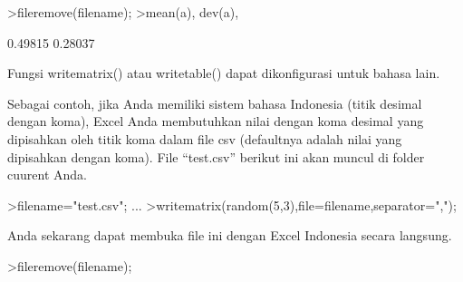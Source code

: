 \documentclass[a4paper,10pt]{article}
\begin{document}
\begin{eulernotebook}
\begin{eulercomment}
\begin{eulercomment}
\begin{eulercomment}
\begin{eulercomment}
\begin{eulercomment}
\begin{eulercomment}
\begin{eulercomment}
\begin{eulercomment}
\begin{eulercomment}
\begin{eulercomment}
\begin{eulercomment}
\begin{eulercomment}
\begin{eulercomment}
\begin{eulercomment}
\begin{eulercomment}
\begin{eulercomment}
\begin{eulercomment}
\begin{eulercomment}
\begin{eulercomment}
\begin{eulercomment}
\begin{eulercomment}
\begin{eulercomment}
\begin{eulercomment}
\begin{eulercomment}
\begin{eulercomment}
\begin{eulercomment}
\begin{eulercomment}
\begin{eulercomment}
\begin{eulercomment}
\begin{eulercomment}
\begin{eulercomment}
\begin{eulercomment}
\begin{eulercomment}
\begin{eulercomment}
\begin{eulercomment}
\begin{eulercomment}
\begin{eulercomment}
\begin{eulercomment}
\begin{eulercomment}
\begin{eulercomment}
\begin{eulercomment}
\begin{eulercomment}
\begin{eulercomment}
\begin{eulercomment}
\begin{eulercomment}
\begin{eulercomment}
\begin{eulercomment}
\begin{eulercomment}
\begin{eulercomment}
\begin{eulercomment}
\begin{eulerprompt}
>fileremove(filename);
>mean(a), dev(a),
\end{eulerprompt}
\begin{euleroutput}
  0.49815
  0.28037
\end{euleroutput}
\begin{eulercomment}
Fungsi writematrix() atau writetable() dapat dikonfigurasi untuk
bahasa lain.

Sebagai contoh, jika Anda memiliki sistem bahasa Indonesia (titik
desimal dengan koma), Excel Anda membutuhkan nilai dengan koma desimal
yang dipisahkan oleh titik koma dalam file csv (defaultnya adalah
nilai yang dipisahkan dengan koma). File “test.csv” berikut ini akan
muncul di folder cuurent Anda.
\end{eulercomment}
\begin{eulerprompt}
>filename="test.csv"; ...
>writematrix(random(5,3),file=filename,separator=",");
\end{eulerprompt}
\begin{eulercomment}
Anda sekarang dapat membuka file ini dengan Excel Indonesia secara
langsung.
\end{eulercomment}
\begin{eulerprompt}
>fileremove(filename);

\end{eulerprompt}
\end{eulercomment}
\end{eulercomment}
\end{eulercomment}
\end{eulercomment}
\end{eulercomment}
\end{eulercomment}
\end{eulercomment}
\end{eulercomment}
\end{eulercomment}
\end{eulercomment}
\end{eulercomment}
\end{eulercomment}
\end{eulercomment}
\end{eulercomment}
\end{eulercomment}
\end{eulercomment}
\end{eulercomment}
\end{eulercomment}
\end{eulercomment}
\end{eulercomment}
\end{eulercomment}
\end{eulercomment}
\end{eulercomment}
\end{eulercomment}
\end{eulercomment}
\end{eulercomment}
\end{eulercomment}
\end{eulercomment}
\end{eulercomment}
\end{eulercomment}
\end{eulercomment}
\end{eulercomment}
\end{eulercomment}
\end{eulercomment}
\end{eulercomment}
\end{eulercomment}
\end{eulercomment}
\end{eulercomment}
\end{eulercomment}
\end{eulercomment}
\end{eulercomment}
\end{eulercomment}
\end{eulercomment}
\end{eulercomment}
\end{eulercomment}
\end{eulercomment}
\end{eulercomment}
\end{eulercomment}
\end{eulercomment}
\end{eulercomment}
\end{eulernotebook}
\end{document}
